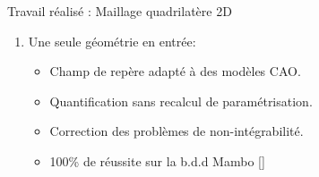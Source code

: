 \begin{frame}{Travail réalisé : Maillage quadrilatère 2D}
    \begin{enumerate}
        \item Une seule géométrie en entrée:
        \begin{itemize}
            \item Champ de repère adapté à des modèles CAO.
            \item Quantification sans recalcul de paramétrisation.
            \item Correction des problèmes de non-intégrabilité.
            \item 100\% de réussite sur la b.d.d Mambo [\cite{ledoux_mambo_2019}] 
        \end{itemize}
    \end{enumerate}
\end{frame}
    
